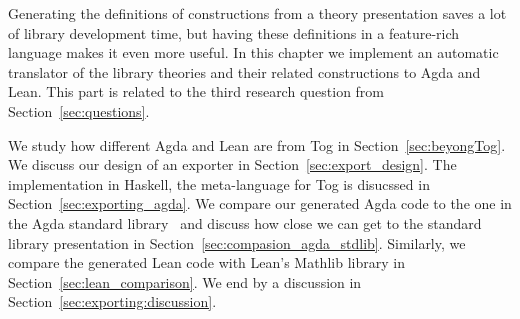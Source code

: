 \label{ch:export}


Generating the definitions of constructions from a theory presentation saves a lot of library development time, but having these definitions in a feature-rich language makes it even more useful. In this chapter we implement an automatic translator of the library theories and their related constructions to Agda and Lean. This part is related to the third research question from Section~\ref{sec:questions}. 

We study how different Agda and Lean are from Tog in Section~\ref{sec:beyongTog}. We discuss our design of an exporter in Section~\ref{sec:export_design}. The implementation in Haskell, the meta-language for Tog is disucssed in Section~\ref{sec:exporting_agda}. We compare our generated Agda code to the one in the Agda standard library~\cite{agda_stdlib} and discuss how close we can get to the standard library presentation in Section~\ref{sec:compasion_agda_stdlib}. Similarly, we compare the generated Lean code with Lean's Mathlib library in Section~\ref{sec:lean_comparison}.  
We end by a discussion in Section~\ref{sec:exporting:discussion}. 

